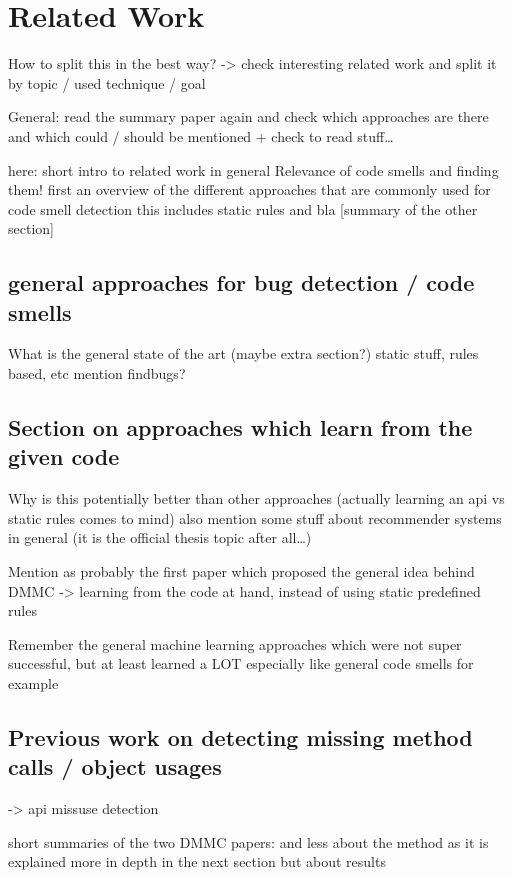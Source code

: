 \chapter{Related Work}

How to split this in the best way?
-> check interesting related work and split it by topic / used technique / goal

General: read the summary paper \cite{robillard2013automated} again and check which approaches are there and which could / should be mentioned
+ check to read stuff\ldots

here: short intro to related work in general
Relevance of code smells and finding them!
first an overview of the different approaches that are commonly used for code smell detection
this includes static rules and bla
[summary of the other section]

\section{general approaches for bug detection / code smells}
What is the general state of the art (maybe extra section?)
static stuff, rules based, etc
mention findbugs?

\section{Section on approaches which learn from the given code}
Why is this potentially better than other approaches (actually learning an api vs static rules comes to mind)
also mention some stuff about recommender systems in general (it is the official thesis topic after all\ldots)

Mention \cite{engler2001bugs} as probably the first paper which proposed the general idea behind DMMC -> learning from the code at hand, instead of using static predefined rules

Remember the general machine learning approaches which were not super successful, but at least learned a LOT
especially like general code smells for example

\section{Previous work on detecting missing method calls / object usages}
-> api missuse detection

short summaries of the two DMMC papers: \cite{monperrus2010detecting} and \cite{monperrus2013detecting}
    less about the method as it is explained more in depth in the next section but about results

